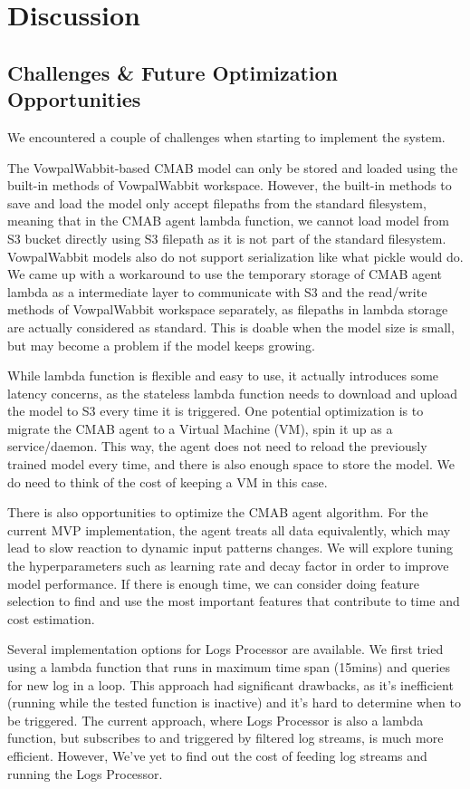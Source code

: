 \documentclass[conference]{IEEEtran}
\begin{document}
\section{Discussion}

\subsection{Challenges \& Future Optimization Opportunities}
We encountered a couple of challenges when starting to implement the system.

The VowpalWabbit-based CMAB model can only be stored and loaded using the built-in methods of VowpalWabbit workspace. However, the built-in methods to save and load the model only accept filepaths from the standard filesystem, meaning that in the CMAB agent lambda function, we cannot load model from S3 bucket directly using S3 filepath as it is not part of the standard filesystem. VowpalWabbit models also do not support serialization like what pickle would do. We came up with a workaround to use the temporary storage of CMAB agent lambda as a intermediate layer to communicate with S3 and the read/write methods of VowpalWabbit workspace separately, as filepaths in lambda storage are actually considered as standard. This is doable when the model size is small, but may become a problem if the model keeps growing. 

While lambda function is flexible and easy to use, it actually introduces some latency concerns, as the stateless lambda function needs to download and upload the model to S3 every time it is triggered. One potential optimization is to migrate the CMAB agent to a Virtual Machine (VM), spin it up as a service/daemon. This way, the agent does not need to reload the previously trained model every time, and there is also enough space to store the model. We do need to think of the cost of keeping a VM in this case.

There is also opportunities to optimize the CMAB agent algorithm. For the current MVP implementation, the agent treats all data equivalently, which may lead to slow reaction to dynamic input patterns changes. We will explore tuning the hyperparameters\cite{vw_parameters} such as learning rate and decay factor in order to improve model performance. If there is enough time, we can consider doing feature selection to find and use the most important features that contribute to time and cost estimation.

Several implementation options for Logs Processor are available. We first tried using a lambda function that runs in maximum time span (15mins) and queries for new log in a loop. This approach had significant drawbacks, as it's inefficient (running while the tested function is inactive) and it's hard to determine when to be triggered. The current approach, where Logs Processor is also a lambda function, but subscribes to and triggered by filtered log streams, is much more efficient. However, We've yet to find out the cost of feeding log streams and running the Logs Processor.
\end{document}
